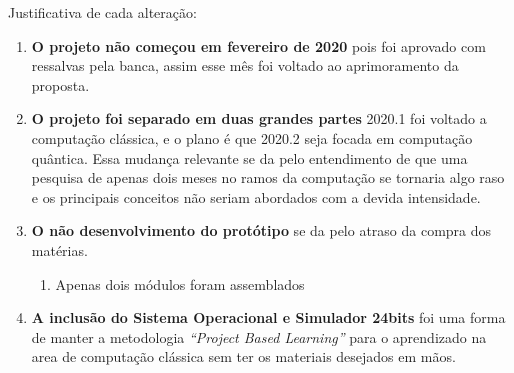 Justificativa de cada alteração:
\begin{enumerate}
  \item \textbf{O projeto não começou em fevereiro de 2020} pois foi aprovado com ressalvas pela banca, assim esse mês foi voltado ao aprimoramento da proposta.
  \item \textbf{O projeto foi separado em duas grandes partes} 2020.1 foi voltado a computação clássica, e o plano é que 2020.2 seja focada em computação quântica. Essa mudança relevante se da pelo entendimento de que uma pesquisa de apenas dois meses no ramos da computação se tornaria algo raso e os principais conceitos não seriam abordados com a devida intensidade.
  \item \textbf{O não desenvolvimento do protótipo} se da pelo atraso da compra dos matérias.
  \begin{enumerate}
    \item Apenas dois módulos foram assemblados
  \end{enumerate}
  \item \textbf{A inclusão do Sistema Operacional e Simulador 24bits} foi uma forma de manter a metodologia \textit{``Project Based Learning''} para o aprendizado na area de computação clássica sem ter os materiais desejados em mãos.
\end{enumerate}

